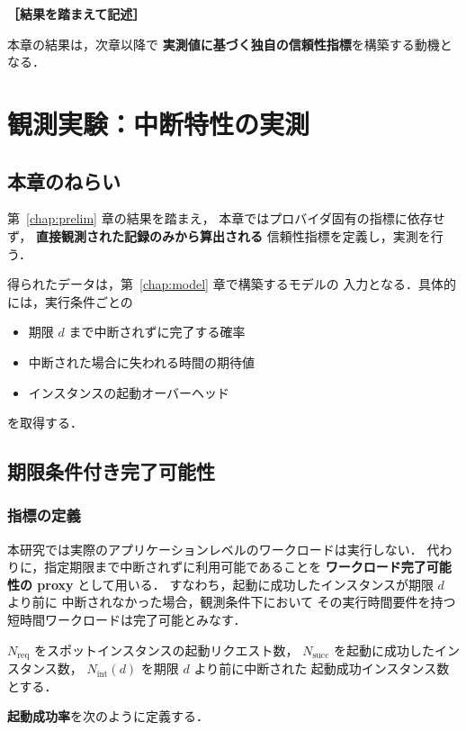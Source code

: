 \documentclass[11pt,a4paper]{ltjsreport}
\newcommand{\Nreq}{N_{\mathrm{req}}}
\newcommand{\Nsucc}{N_{\mathrm{succ}}}
\newcommand{\Nint}{N_{\mathrm{int}}}
\newcommand{\TBD}[1]{\textbf{［#1］}}
\begin{document}
\TBD{結果を踏まえて記述}

本章の結果は，次章以降で
\textbf{実測値に基づく独自の信頼性指標}を構築する動機となる．

\chapter{観測実験：中断特性の実測}
\label{chap:measure}

\section{本章のねらい}

第~\ref{chap:prelim} 章の結果を踏まえ，
本章ではプロバイダ固有の指標に依存せず，
\textbf{直接観測された記録のみから算出される}
信頼性指標を定義し，実測を行う．

得られたデータは，第~\ref{chap:model} 章で構築するモデルの
入力となる．具体的には，実行条件ごとの

\begin{itemize}
  \item 期限 $d$ まで中断されずに完了する確率
  \item 中断された場合に失われる時間の期待値
  \item インスタンスの起動オーバーヘッド
\end{itemize}

を取得する．

\section{期限条件付き完了可能性}

\subsection{指標の定義}

本研究では実際のアプリケーションレベルのワークロードは実行しない．
代わりに，指定期限まで中断されずに利用可能であることを
\textbf{ワークロード完了可能性の proxy} として用いる．
すなわち，起動に成功したインスタンスが期限 $d$ より前に
中断されなかった場合，観測条件下において
その実行時間要件を持つ短時間ワークロードは完了可能とみなす．

$\Nreq$ をスポットインスタンスの起動リクエスト数，
$\Nsucc$ を起動に成功したインスタンス数，
$\Nint(d)$ を期限 $d$ より前に中断された
起動成功インスタンス数とする．

\textbf{起動成功率}を次のように定義する．
\end{document}
